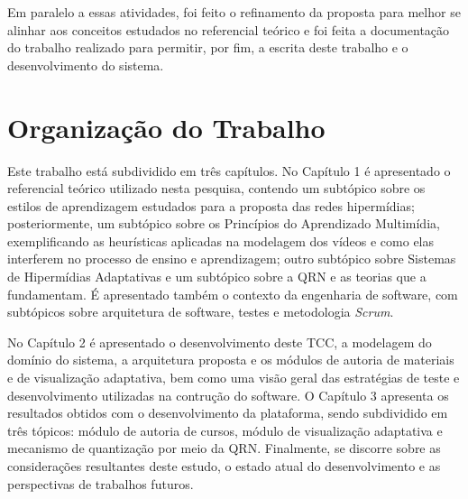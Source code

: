 Em paralelo a essas atividades, foi feito o refinamento da proposta para melhor se alinhar aos conceitos estudados no referencial teórico e foi feita a documentação do trabalho realizado para permitir, por fim, a escrita deste trabalho e o desenvolvimento do sistema.

\section*{Organização do Trabalho}

Este trabalho está subdividido em três capítulos. No Capítulo 1 é apresentado o referencial teórico utilizado nesta pesquisa, contendo um subtópico sobre os estilos de aprendizagem estudados para a proposta das redes hipermídias; posteriormente, um subtópico sobre os Princípios do Aprendizado Multimídia, exemplificando as heurísticas aplicadas na modelagem dos vídeos e como elas interferem no processo de ensino e aprendizagem; outro subtópico sobre Sistemas de Hipermídias Adaptativas e um subtópico sobre a QRN e as teorias que a fundamentam. É apresentado também o contexto da engenharia de software, com subtópicos sobre arquitetura de software, testes e  metodologia \textit{Scrum}.

No Capítulo 2 é apresentado o desenvolvimento deste TCC, a modelagem do domínio do sistema, a arquitetura proposta e os módulos de autoria de materiais e de visualização adaptativa, bem como uma visão geral das estratégias de teste e desenvolvimento utilizadas na contrução do software. O Capítulo 3 apresenta os resultados obtidos com o desenvolvimento da plataforma, sendo subdividido em três tópicos: módulo de autoria de cursos, módulo de visualização adaptativa e mecanismo de quantização por meio da QRN. Finalmente, se discorre sobre as considerações resultantes deste estudo, o estado atual do desenvolvimento e as perspectivas de trabalhos futuros.
